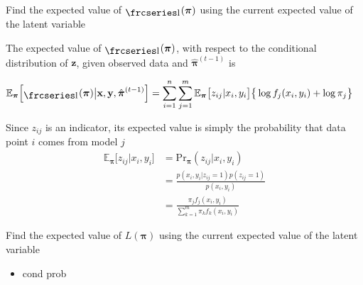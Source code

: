 \documentclass{beamer}
\newcommand{\textfrc}[1]{{\frcseries#1}}
\newcommand{\mathfrc}[1]{\raisebox{-0.8mm}{\text{\textfrc{\small #1}}}\hspace{0.4mm}}
\newcommand{\eqn}[1]{\begin{align*}
#1
\end{align*}}
\newcommand{\vect}[1]{\boldsymbol{\mathbf{#1}}}
\newcommand{\bl}{\big\{}
\newcommand{\br}{\big\}}
\newcommand{\vx}{\vect{x}}
\newcommand{\vy}{\vect{y}}
\newcommand{\vp}{\vect{\pi}}
\newcommand{\vph}{\hat{\vect{\pi}}}
\newcommand{\sumn}{\sum^n_{i=1}}
\newcommand{\summ}{\sum^m_{j=1}}
\newcommand{\fab}{f_j}
\newcommand{\llp}{\mathfrc{l}(\vect{\pi})}
\begin{document}
\begin{frame}{Find the expected value of $\llp$ using the current expected value of the latent variable}
	
	The expected value of $\llp$, with respect to the conditional distribution of $\vect{z}$, given observed data and $\vph^{(t-1)}$ is
	
	\eqn{
		\mathbb{E}_{\vp}\Big[\llp \big| \vx,\vy,\vph^{(t-1)} \Big] &= \sumn \summ \mathbb{E}_{\vp}\big[z_{ij}|x_i,y_i\big] \bl \log \fab(x_i,y_i) + \log \pi_j  \br
	}
	
	Since $z_{ij}$ is an indicator, its expected value is simply the probability that data point $i$ comes from model $j$
	\eqn{
		\mathbb{E}_{\vp}\Big[  z_{ij} | x_i, y_i \Big]	&= \text{Pr}_{\vp}(z_{ij}|x_i,y_i)	\\
										&= \frac{p(x_i,y_i|z_{ij}=1)p(z_{ij}=1)}{p(x_i,y_i)}	\\
										&=  \frac{\pi_j \fab(x_i,y_i)  }{\sum^{m}_{k=1} \pi_k f_k(x_i,y_i)}
	}
\end{frame}
\begin{frame}[shrink]{Find the expected value of $L(\vect{\pi})$ using the current expected value of the latent variable}
	
	\begin{itemize}
		\item cond prob
	\end{itemize}
	
\end{frame}
\end{document}
